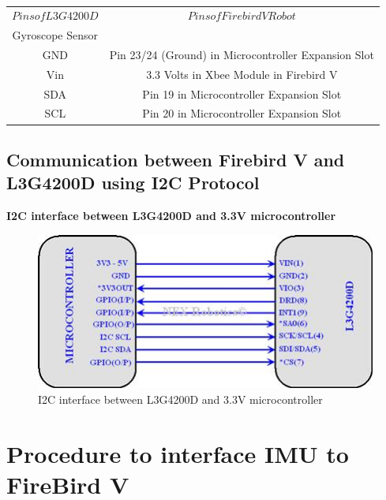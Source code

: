\documentclass[a4paper,12 pt]{article}
\begin{document}
\vspace{-10mm}
\begin{center}
\begin{table}[!h]
\hspace{-10mm}
\caption{}
\begin{tabular}{|c|c|}

\hline

$Pins of L3G4200D$&$Pins of Firebird V Robot $\\
Gyroscope Sensor$ $&$$\\
\hline
GND&Pin 23/24 (Ground) in Microcontroller Expansion Slot\\
\hline
Vin&3.3 Volts in Xbee Module in Firebird V\\
\hline
SDA&Pin 19 in Microcontroller Expansion Slot\\
\hline
SCL&Pin 20 in Microcontroller Expansion Slot\\


\hline
\end{tabular}
\label{table:t1}
\end{table}
\end{center}
\subsection{Communication between Firebird V and L3G4200D using I2C Protocol}
\textbf{I2C interface between L3G4200D and 3.3V microcontroller}

\begin{figure}[!h]
\begin{center}
 \includegraphics[]{gyr5.jpg}
\end{center}
\caption{I2C interface between L3G4200D and 3.3V microcontroller}
\label{fig:1}
\end{figure}

\newpage
\section{Procedure to interface IMU to FireBird V}
\end{document}
